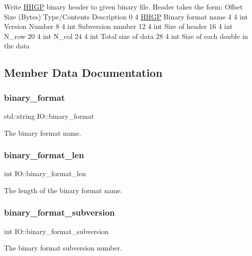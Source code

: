 Write \mbox{\hyperlink{class_h_h_g_p}{H\+H\+GP}} binary header to given binary file. Header takes the form\+: Offset Size (Bytes) Type/\+Contents Description 0 4 \textquotesingle{}\mbox{\hyperlink{class_h_h_g_p}{H\+H\+GP}}\textquotesingle{} Binary format name 4 4 int Version Number 8 4 int Subversion number 12 4 int Size of header 16 4 int N\+\_\+row 20 4 int N\+\_\+col 24 4 int Total size of data 28 4 int Size of each double in the data

\subsection{Member Data Documentation}
\mbox{\label{class_i_o_a254c13a437051a09be72f77173017576}} 
\subsubsection{\texorpdfstring{binary\_format}{binary\_format}}
{\footnotesize\ttfamily std\+::string I\+O\+::binary\+\_\+format}

The binary format name. \mbox{\label{class_i_o_a2a1699a4cde1ce8631ae0309bc75d336}} 
\subsubsection{\texorpdfstring{binary\_format\_len}{binary\_format\_len}}
{\footnotesize\ttfamily int I\+O\+::binary\+\_\+format\+\_\+len}

The length of the binary format name. \mbox{\label{class_i_o_ad5c0c344b35565bb355c5d714121787b}} 
\subsubsection{\texorpdfstring{binary\_format\_subversion}{binary\_format\_subversion}}
{\footnotesize\ttfamily int I\+O\+::binary\+\_\+format\+\_\+subversion}

The binary format subversion number. \mbox{\label{class_i_o_aaf91ba1d8be1503b44b2b1b1b666303b}} 
